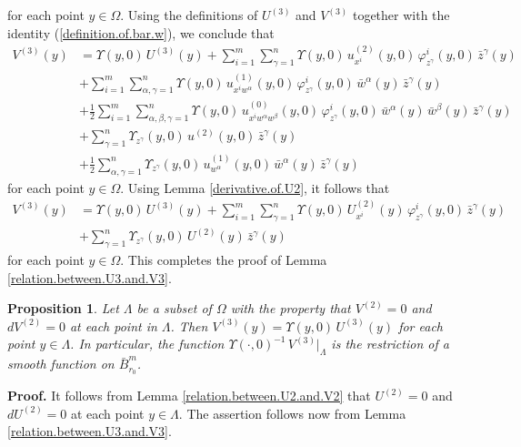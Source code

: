 \documentclass[11pt]{amsart}
\newtheorem{proposition}[theorem]{Proposition}
\theoremstyle{definition}
\begin{document}
for each point $y \in \Omega$. Using the definitions of $U^{(3)}$ and $V^{(3)}$ together with the identity (\ref{definition.of.bar.w}), we conclude that 
\begin{align*} 
V^{(3)}(y) 
&= \Upsilon(y,0) \, U^{(3)}(y) + \sum_{i=1}^m \sum_{\gamma=1}^n \Upsilon(y,0) \, u^{(2)}_{x^i}(y,0) \, \varphi^i_{z^\gamma}(y,0) \, \bar{z}^\gamma(y) \\ 
&+ \sum_{i=1}^m \sum_{\alpha,\gamma=1}^n \Upsilon(y,0) \, u^{(1)}_{x^i w^\alpha}(y,0) \, \varphi^i_{z^\gamma}(y,0) \, \bar{w}^\alpha(y) \, \bar{z}^\gamma(y) \\ 
&+ \frac{1}{2} \sum_{i=1}^m \sum_{\alpha,\beta,\gamma=1}^n \Upsilon(y,0) \, u^{(0)}_{x^i w^\alpha w^\beta}(y,0) \, \varphi^i_{z^\gamma}(y,0) \, \bar{w}^\alpha(y) \, \bar{w}^\beta(y) \, \bar{z}^\gamma(y) \\ 
&+ \sum_{\gamma=1}^n \Upsilon_{z^\gamma}(y,0) \, u^{(2)}(y,0)  \, \bar{z}^\gamma(y) \\ 
&+ \frac{1}{2} \sum_{\alpha,\gamma=1}^n \Upsilon_{z^\gamma}(y,0) \, u^{(1)}_{w^\alpha}(y,0) \, \bar{w}^\alpha(y) \, \bar{z}^\gamma(y)
\end{align*} 
for each point $y \in \Omega$. Using Lemma \ref{derivative.of.U2}, it follows that 
\begin{align*} 
V^{(3)}(y) 
&= \Upsilon(y,0) \, U^{(3)}(y) + \sum_{i=1}^m \sum_{\gamma=1}^n \Upsilon(y,0) \, U^{(2)}_{x^i}(y) \, \varphi^i_{z^\gamma}(y,0) \, \bar{z}^\gamma(y) \\ 
&+ \sum_{\gamma=1}^n \Upsilon_{z^\gamma}(y,0) \, U^{(2)}(y)  \, \bar{z}^\gamma(y) 
\end{align*}
for each point $y \in \Omega$. This completes the proof of Lemma \ref{relation.between.U3.and.V3}. \\


\begin{proposition} 
\label{invariance}
Let $\Lambda$ be a subset of $\Omega$ with the property that $V^{(2)} = 0$ and $dV^{(2)} = 0$ at each point in $\Lambda$. Then $V^{(3)}(y) = \Upsilon(y,0) \, U^{(3)}(y)$ for each point $y \in \Lambda$. In particular, the function $\Upsilon(\cdot,0)^{-1} \, V^{(3)}|_\Lambda$ is the restriction of a smooth function on $\bar{B}_{r_0}^m$.
\end{proposition}

\textbf{Proof.} 
It follows from Lemma \ref{relation.between.U2.and.V2} that $U^{(2)} = 0$ and $dU^{(2)} = 0$ at each point $y \in \Lambda$. The assertion follows now from Lemma \ref{relation.between.U3.and.V3}. \\
\end{document}
